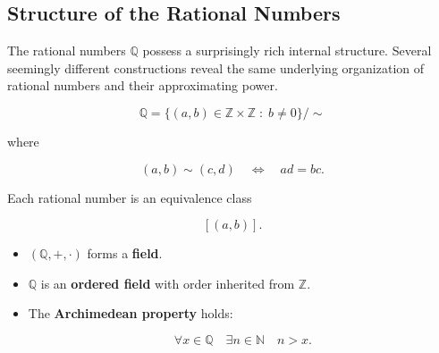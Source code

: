 
\subsection*{Structure of the Rational Numbers}

\begin{remark*}

The rational numbers $\mathbb{Q}$ possess a surprisingly rich internal
structure.  Several seemingly different constructions reveal the same
underlying organization of rational numbers and their approximating
power.

\end{remark*}


\begin{tcolorbox}[colback=gray!6, colframe=gray!40, arc=2pt,
title={Construction of $\mathbb{Q}$}]

\[
\mathbb{Q}
=
\{(a,b)\in\mathbb{Z}\times\mathbb{Z}\;:\; b\neq0\}/\sim
\]

where

\[
(a,b)\sim(c,d)
\quad\Longleftrightarrow\quad
ad=bc.
\]

Each rational number is an equivalence class

\[
[(a,b)].
\]

\end{tcolorbox}

\begin{exposition}
\medskip
\end{exposition}


\begin{tcolorbox}[colback=gray!6, colframe=gray!40, arc=2pt,
title={Algebraic Structure}]

\begin{itemize}

\item $(\mathbb{Q},+,\cdot)$ forms a \textbf{field}.

\item $\mathbb{Q}$ is an \textbf{ordered field} with order inherited
from $\mathbb{Z}$.

\item The \textbf{Archimedean property} holds:

\[
\forall x\in\mathbb{Q}
\quad
\exists n\in\mathbb{N}
\quad
n>x.
\]

\end{itemize}

\end{tcolorbox}

